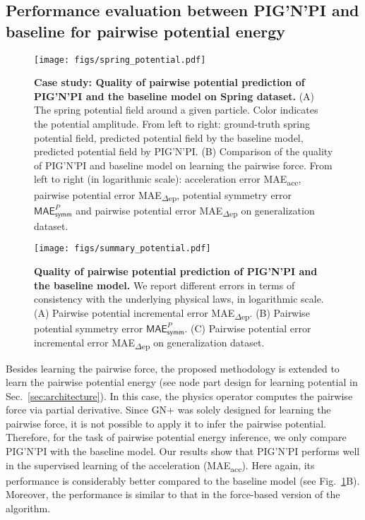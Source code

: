 \documentclass{article}
\newcommand{\pignpi}{PIG'N'PI\xspace}
\newcommand{\lemos}{GN+\xspace}
\begin{document}
\subsection{Performance evaluation between \pignpi and baseline for pairwise potential energy}
\label{sec:results_pignpi_vs_baseline_potential}


\begin{figure}[h!]
    \centering
    \texttt{[image: figs/spring\_potential.pdf]}
    \caption{\textbf{Case study: Quality of pairwise potential prediction of \pignpi and the baseline model on Spring dataset. } (A) The spring potential field around a given particle. Color indicates the potential amplitude. From left to right: ground-truth spring potential field, predicted potential field by the baseline model, predicted potential field by \pignpi. (B) Comparison of the quality of \pignpi and baseline model on learning the pairwise force. From left to right (in logarithmic scale): acceleration error \textsf{MAE\textsubscript{acc}}, pairwise potential error \textsf{MAE\textsubscript{$\Delta$ep}}, potential symmetry error $\textsf{MAE}_\textsf{symm}^{P}$ and pairwise potential error \textsf{MAE\textsubscript{$\Delta$ep}} on generalization dataset.}
    \label{fig:spring_potential_result}
\end{figure}






\begin{figure}[h!]
    \centering
    \texttt{[image: figs/summary\_potential.pdf]}
    \caption{\textbf{Quality of pairwise potential prediction of \pignpi and the baseline model.} We report different errors in terms of consistency with the underlying physical laws, in logarithmic scale. (A) Pairwise potential incremental error \textsf{MAE\textsubscript{$\Delta$ep}}. (B) Pairwise potential symmetry error $\textsf{MAE}_\textsf{symm}^{P}$. (C) Pairwise potential error incremental error \textsf{MAE\textsubscript{$\Delta$ep}} on generalization dataset.}
    \label{fig:potential_summary}
\end{figure}

Besides learning the pairwise force, the proposed methodology is extended to learn the pairwise potential energy (see node part design for learning potential in Sec.~\ref{sec:architecture}). In this case, the physics operator computes the pairwise force via partial derivative.
{Since \lemos was solely designed for learning the pairwise force, it is not possible to apply it to infer the pairwise potential. Therefore, for the task of pairwise potential energy inference, we only compare \pignpi with the baseline model.}
Our results show that \pignpi performs well in the supervised learning of the acceleration (\textsf{MAE\textsubscript{acc}}). Here again, its performance is considerably better compared to the baseline model (see Fig.~\ref{fig:spring_potential_result}B). Moreover, the performance is similar to that in the force-based version of the algorithm. 
\end{document}
